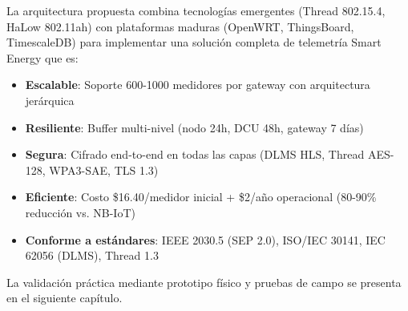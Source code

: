 La arquitectura propuesta combina tecnologías emergentes (Thread 802.15.4, HaLow 802.11ah) con plataformas maduras (OpenWRT, ThingsBoard, TimescaleDB) para implementar una solución completa de telemetría Smart Energy que es:

\begin{itemize}
    \item \textbf{Escalable}: Soporte 600-1000 medidores por gateway con arquitectura jerárquica
    \item \textbf{Resiliente}: Buffer multi-nivel (nodo 24h, DCU 48h, gateway 7 días)
    \item \textbf{Segura}: Cifrado end-to-end en todas las capas (DLMS HLS, Thread AES-128, WPA3-SAE, TLS 1.3)
    \item \textbf{Eficiente}: Costo \$16.40/medidor inicial + \$2/año operacional (80-90\% reducción vs. NB-IoT)
    \item \textbf{Conforme a estándares}: IEEE 2030.5 (SEP 2.0), ISO/IEC 30141, IEC 62056 (DLMS), Thread 1.3
\end{itemize}

La validación práctica mediante prototipo físico y pruebas de campo se presenta en el siguiente capítulo.


